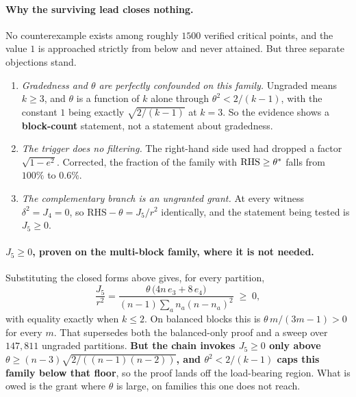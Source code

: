\paragraph{Why the surviving lead closes nothing.} No counterexample exists among roughly $1500$ verified critical points, and the value $1$ is approached strictly from below and never attained. But three separate objections stand.
\begin{enumerate}[leftmargin=1.6em]
\item \emph{Gradedness and $\theta$ are perfectly confounded on this family.} Ungraded means $k\ge3$, and $\theta$ is a function of $k$ alone through $\theta^2<2/(k-1)$, with the constant $1$ being exactly $\sqrt{2/(k-1)}$ at $k=3$. So the evidence shows a \textbf{block-count} statement, not a statement about gradedness.
\item \emph{The trigger does no filtering.} The right-hand side used had dropped a factor $\sqrt{1-e^2}$. Corrected, the fraction of the family with $\mathrm{RHS}\ge\theta^{*}$ falls from $100\%$ to $0.6\%$.
\item \emph{The complementary branch is an ungranted grant.} At every witness $\delta^2=J_4=0$, so $\mathrm{RHS}-\theta=J_5/r^2$ identically, and the statement being tested is $J_5\ge0$.
\end{enumerate}

\paragraph{$J_5\ge0$, proven on the multi-block family, where it is not needed.} Substituting the closed forms above gives, for every partition,
\[
\frac{J_5}{r^2}=\frac{\theta\,\big(4n\,e_3+8\,e_4\big)}{(n-1)\sum_a n_a(n-n_a)^2}\;\ge\;0,
\]
with equality exactly when $k\le2$. On balanced blocks this is $\theta\,m/(3m-1)>0$ for every $m$. That supersedes both the balanced-only proof and a sweep over $147{,}811$ ungraded partitions. \textbf{But the chain invokes $J_5\ge0$ only above $\theta\ge(n-3)\sqrt{2/((n-1)(n-2))}$, and $\theta^2<2/(k-1)$ caps this family below that floor}, so the proof lands off the load-bearing region. What is owed is the grant where $\theta$ is large, on families this one does not reach.


